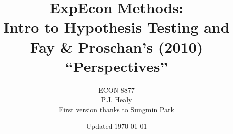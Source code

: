 

\newtheorem{per}{Perspective}

\newcommand{\leftcol}{}
\newcommand{\maincol}{}
\newcommand{\margin}{}
\newcommand{\myspacing}{}	
\newcommand{\thus}{$\Rightarrow$ }

\title[Hypothesis Test Perspectives]{ExpEcon Methods:\\
Intro to Hypothesis Testing and\\Fay \& Proschan's (2010) ``Perspectives''}
  \author[ECON 8877]{ECON 8877\\P.J. Healy\\First version thanks to Sungmin Park}
  \institute[OSU]{}
\date[]{\vfill {\tiny Updated \today}}



\begin{frame}
    \maketitle
\end{frame}

